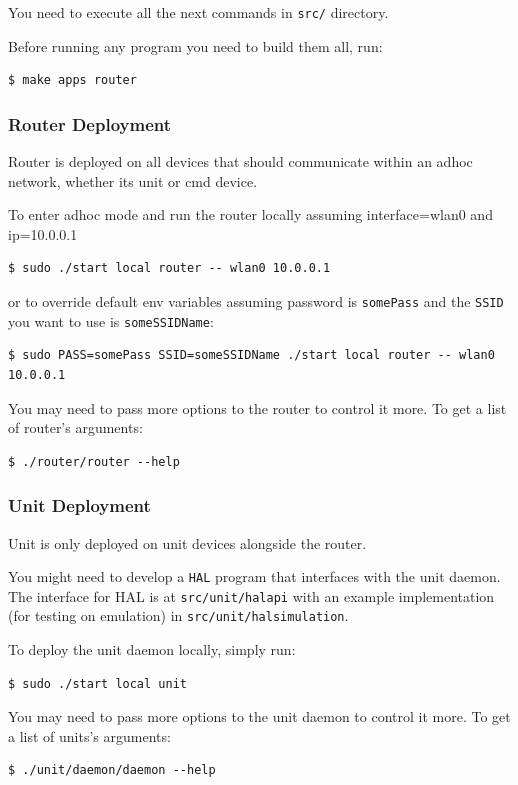 You need to execute all the next commands in \texttt{src/} directory.

Before running any program you need to build them all, run:
\begin{verbatim}
$ make apps router
\end{verbatim}

\subsubsection{Router Deployment}
Router is deployed on all devices that should communicate within an adhoc network, whether its unit or cmd device.

To enter adhoc mode and run the router locally assuming interface=wlan0 and ip=10.0.0.1
\begin{verbatim}
$ sudo ./start local router -- wlan0 10.0.0.1
\end{verbatim}

or to override default env variables assuming password is \texttt{somePass} and the \texttt{SSID} you want to use is \texttt{someSSIDName}:
\begin{verbatim}
$ sudo PASS=somePass SSID=someSSIDName ./start local router -- wlan0 10.0.0.1
\end{verbatim}

You may need to pass more options to the router to control it more. 
To get a list of router's arguments:
\begin{verbatim}
$ ./router/router --help
\end{verbatim}

\subsubsection{Unit Deployment}
Unit is only deployed on unit devices alongside the router.

You might need to develop a \texttt{HAL} program that interfaces with the unit daemon.
The interface for HAL is at \texttt{src/unit/halapi} with an example implementation (for testing on emulation) in \texttt{src/unit/halsimulation}.

To deploy the unit daemon locally, simply run:
\begin{verbatim}
$ sudo ./start local unit
\end{verbatim}

You may need to pass more options to the unit daemon to control it more. 
To get a list of units's arguments:
\begin{verbatim}
$ ./unit/daemon/daemon --help
\end{verbatim}

